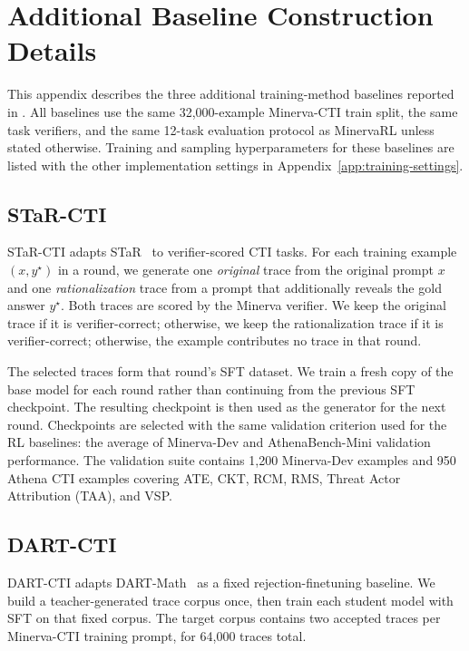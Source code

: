 \section{Additional Baseline Construction Details}
\label{app:additional-baselines}

This appendix describes the three additional training-method baselines reported in . All baselines use the same 32{,}000-example Minerva-CTI train split, the same task verifiers, and the same 12-task evaluation protocol as MinervaRL unless stated otherwise. Training and sampling hyperparameters for these baselines are listed with the other implementation settings in Appendix~\ref{app:training-settings}.

\subsection{STaR-CTI}
\label{app:star-cti}

STaR-CTI adapts STaR~\citep{NEURIPS2022_639a9a17} to verifier-scored CTI tasks. For each training example $(x,y^\star)$ in a round, we generate one \emph{original} trace from the original prompt $x$ and one \emph{rationalization} trace from a prompt that additionally reveals the gold answer $y^\star$. Both traces are scored by the Minerva verifier. We keep the original trace if it is verifier-correct; otherwise, we keep the rationalization trace if it is verifier-correct; otherwise, the example contributes no trace in that round.

The selected traces form that round's SFT dataset. We train a fresh copy of the base model for each round rather than continuing from the previous SFT checkpoint. The resulting checkpoint is then used as the generator for the next round. Checkpoints are selected with the same validation criterion used for the RL baselines: the average of Minerva-Dev and AthenaBench-Mini validation performance. The validation suite contains 1{,}200 Minerva-Dev examples and 950 Athena CTI examples covering ATE, CKT, RCM, RMS, Threat Actor Attribution (TAA), and VSP.

\subsection{DART-CTI}
\label{app:dart-cti}

DART-CTI adapts DART-Math~\citep{NEURIPS2024_0ef1afa0} as a fixed rejection-finetuning baseline. We build a teacher-generated trace corpus once, then train each student model with SFT on that fixed corpus. The target corpus contains two accepted traces per Minerva-CTI training prompt, for 64{,}000 traces total.


